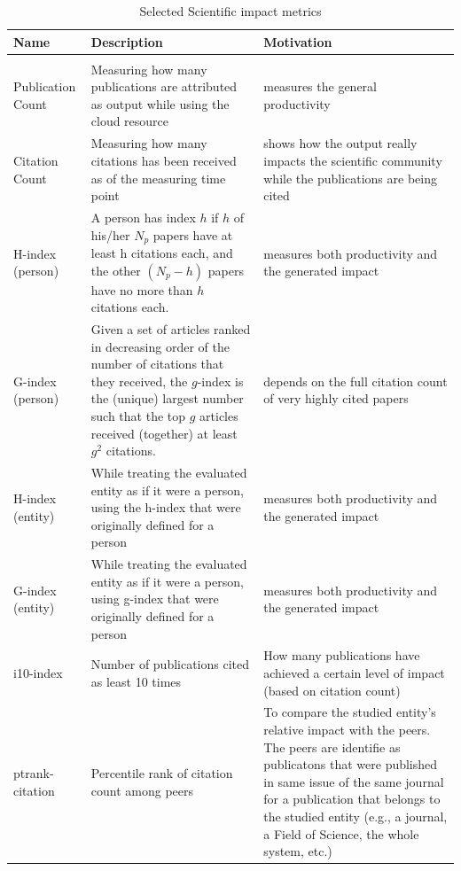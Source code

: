 \documentclass{sig-alternate-05-2015}
\begin{document}
\begin{table}[htb]
\caption{Selected Scientific impact metrics}
\begin{scriptsize}
\label{T:SIMmetrics}
\bigskip
\begin{center}
\begin{tabular}{p{}p{}p{}}
Name & Description & Motivation \\
\hline
\rowcolor{blue!20} \multicolumn{3}{l}{\bf Scientific impact metrics} \\
\hline
Publication Count &
Measuring how many publications are attributed as output while using the cloud 
resource &
measures the general productivity \\
\hline 
Citation Count &
Measuring how many citations has been received as of the measuring time point &
shows how the output really impacts the scientific community while the 
publications are being cited \\
\hline
H-index (person) \cite{hirsch2005index} &
A person has index $h$ if $h$ of his/her $N_p$ papers have at least h
                   citations each, and the other $(N_p − h)$ papers have
                   no more than $h$ citations each. &
 measures both productivity and the generated impact \\
\hline
G-index (person) \cite{egghe2006theory} &
Given a set of articles ranked in decreasing order of the number of citations that they received, the $g$-index is the (unique) largest number such that the top $g$ articles received (together) at least $g^2$ citations.&
depends on the full citation count of very highly cited papers\\
\hline
H-index (entity) &
While treating the evaluated entity as if it were a person, using the
h-index that were originally defined for a person &
measures both productivity and the generated impact \\
\hline
G-index (entity)&
While treating the evaluated entity as if it were a person, using 
g-index that were originally defined for a person &
measures both productivity and the generated impact \\
\hline
i10-index \cite{www-i10index} &
Number of publications cited as least 10 times &
How many publications have achieved a certain level of impact (based on citation count) \\
\hline
ptrank-citation \cite{las14Impact,las15xsede,las15cluster} &
Percentile rank of citation count among peers &
To compare the studied entity's relative impact with the peers. The peers are identifie as publicatons that were published in same issue of the same journal for a publication that belongs to the studied entity (e.g., a journal, a Field of Science, the whole system, etc.) \\
\hline
\end{tabular}
\end{center}
\end{scriptsize}
\end{table}
\end{document}
